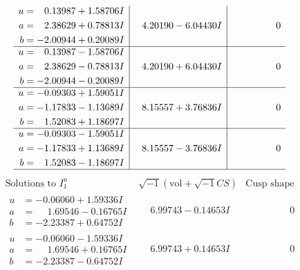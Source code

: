 \documentclass[1p]{elsarticle_modified}
\theoremstyle{definition}
\newcommand{\I}{\sqrt{-1}}
\begin{document}
$$\begin{array}{c|c|c}
\begin{aligned}
u &= \phantom{-}0.13987 + 1.58706 I \\
a &= \phantom{-}2.38629 + 0.78813 I \\
b &= -2.00944 + 0.20089 I\end{aligned}
 & \phantom{-}4.20190 - 6.04430 I & \phantom{-0.000000 } 0 \\ \hline\begin{aligned}
u &= \phantom{-}0.13987 - 1.58706 I \\
a &= \phantom{-}2.38629 - 0.78813 I \\
b &= -2.00944 - 0.20089 I\end{aligned}
 & \phantom{-}4.20190 + 6.04430 I & \phantom{-0.000000 } 0 \\ \hline\begin{aligned}
u &= -0.09303 + 1.59051 I \\
a &= -1.17833 - 1.13689 I \\
b &= \phantom{-}1.52083 + 1.18697 I\end{aligned}
 & \phantom{-}8.15557 + 3.76836 I & \phantom{-0.000000 } 0 \\ \hline\begin{aligned}
u &= -0.09303 - 1.59051 I \\
a &= -1.17833 + 1.13689 I \\
b &= \phantom{-}1.52083 - 1.18697 I\end{aligned}
 & \phantom{-}8.15557 - 3.76836 I & \phantom{-0.000000 } 0\\
 \hline 
 \end{array}$$\newpage$$\begin{array}{c|c|c}  
\text{Solutions to }I^u_{1}& \I (\text{vol} + \sqrt{-1}CS) & \text{Cusp shape}\\
 \hline 
\begin{aligned}
u &= -0.06060 + 1.59336 I \\
a &= \phantom{-}1.69546 - 0.16765 I \\
b &= -2.23387 + 0.64752 I\end{aligned}
 & \phantom{-}6.99743 - 0.14653 I & \phantom{-0.000000 } 0 \\ \hline\begin{aligned}
u &= -0.06060 - 1.59336 I \\
a &= \phantom{-}1.69546 + 0.16765 I \\
b &= -2.23387 - 0.64752 I\end{aligned}
 & \phantom{-}6.99743 + 0.14653 I & \phantom{-0.000000 } 0 \\ \hline\begin{aligned}

\end{aligned}
\end{array}$$
\end{document}

